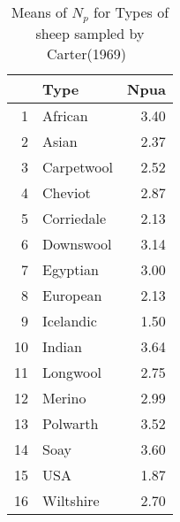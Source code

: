 \begin{table}[ht]
\centering
\caption{Means of $N_{p}$ for Types of sheep sampled by Carter(1969)~\cite{cart:68}}
\label{tab:nptype}
\begin{tabular}{rlr}
  \hline
 & Type & Npua \\ 
  \hline
1 & African & 3.40 \\ 
  2 & Asian & 2.37 \\ 
  3 & Carpetwool & 2.52 \\ 
  4 & Cheviot & 2.87 \\ 
  5 & Corriedale & 2.13 \\ 
  6 & Downswool & 3.14 \\ 
  7 & Egyptian & 3.00 \\ 
  8 & European & 2.13 \\ 
  9 & Icelandic & 1.50 \\ 
  10 & Indian & 3.64 \\ 
  11 & Longwool & 2.75 \\ 
  12 & Merino & 2.99 \\ 
  13 & Polwarth & 3.52 \\ 
  14 & Soay & 3.60 \\ 
  15 & USA & 1.87 \\ 
  16 & Wiltshire & 2.70 \\ 
   \hline
\end{tabular}
\end{table}

